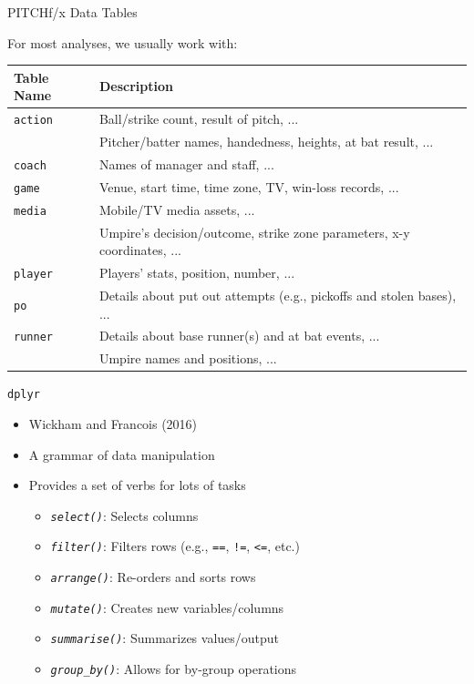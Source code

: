 \begin{frame}{PITCHf/x Data Tables}

For most analyses, we usually work with:

\small

\begin{table}[ht]
\centering
\begin{tabular}{ll}
\hline
Table Name & Description \\ 
\hline
{\texttt{action}} & Ball/strike count, result of pitch, ... \\ 
\rowcolor{SpringGreen}{\texttt{atbat}} & Pitcher/batter names, handedness, heights, at bat result, ... \\ 
{\texttt{coach}} & Names of manager and staff, ... \\ 
{\texttt{game}} & Venue, start time, time zone, TV, win-loss records, ... \\ 
{\texttt{media}} & Mobile/TV media assets, ... \\ 
\rowcolor{SpringGreen}{\texttt{pitch}} & Umpire's decision/outcome, strike zone parameters, x-y coordinates, ... \\ 
{\texttt{player}} & Players' stats, position, number, ... \\ 
{\texttt{po}} & Details about put out attempts (e.g., pickoffs and stolen bases), ... \\ 
{\texttt{runner}} & Details about base runner(s) and at bat events, ... \\ 
\rowcolor{SpringGreen}{\texttt{umpire}} & Umpire names and positions, ... \\ 
\hline
\end{tabular}
\end{table}

\end{frame}

\begin{frame}[fragile]{\texttt{dplyr}}

\begin{itemize}
\tightlist
\item
  Wickham and Francois (2016)
\item
  A grammar of data manipulation
\item
  Provides a set of verbs for lots of tasks

  \begin{itemize}
  \tightlist
  \item
    \emph{\texttt{select()}}: Selects columns
  \item
    \emph{\texttt{filter()}}: Filters rows (e.g., \texttt{==},
    \texttt{!=}, \texttt{\textless{}=}, etc.)
  \item
    \emph{\texttt{arrange()}}: Re-orders and sorts rows
  \item
    \emph{\texttt{mutate()}}: Creates new variables/columns
  \item
    \emph{\texttt{summarise()}}: Summarizes values/output
  \item
    \emph{\texttt{group\_by()}}: Allows for by-group operations
  \end{itemize}
\end{itemize}

\end{frame}

